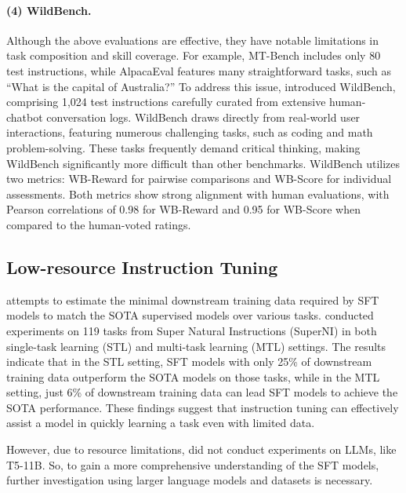 \documentclass[11pt]{article}
\begin{document}
\paragraph{(4) WildBench.}
Although the above evaluations are effective, they have notable limitations in task composition and skill coverage. For example, MT-Bench \cite{hendrycks2020measuring} includes only 80 test instructions, while AlpacaEval \cite{alpaca_eval} features many straightforward tasks, such as “What is the capital of Australia?”
To address this issue, \citet{lin2024wildbench} introduced WildBench, comprising 1,024 test instructions carefully curated from extensive human-chatbot conversation logs. WildBench draws directly from real-world user interactions, featuring numerous challenging tasks, such as coding and math problem-solving. These tasks frequently demand critical thinking, making WildBench significantly more difficult than other benchmarks. 
WildBench utilizes two metrics: WB-Reward for pairwise comparisons and WB-Score for individual assessments. Both metrics show strong alignment with human evaluations, with Pearson correlations of 0.98 for WB-Reward and 0.95 for WB-Score when compared to the human-voted ratings.






\subsection{Low-resource Instruction Tuning}
\citet{gupta2023instruction} attempts to estimate the minimal downstream training data required by SFT models to match the SOTA supervised models over various tasks.
\citet{gupta2023instruction} conducted experiments on 119 tasks from Super Natural Instructions (SuperNI) in both single-task learning (STL) and multi-task learning (MTL) settings. The results indicate that in the STL setting, SFT models with only 25\% of downstream training data outperform the SOTA models on those tasks, while in the MTL setting, just 6\% of downstream training data can lead SFT models to achieve the SOTA performance. These findings suggest that instruction
tuning can effectively assist a model in quickly learning a task even with limited data. 

However, due to resource limitations, \citet{gupta2023instruction} did not conduct experiments on LLMs, like T5-11B. So, to gain a more comprehensive understanding of the SFT models, further investigation using larger language models and datasets is necessary.
\end{document}
